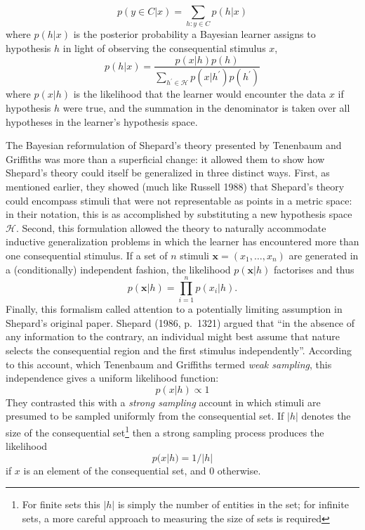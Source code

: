 \documentclass[english,doc]{apa6}
\begin{document}
\begin{equation}
p(y \in C | x) = \sum_{h : y \in C} p(h|x)
\end{equation}
\noindent
where \(p(h|x)\) is the posterior probability a Bayesian learner assigns to hypothesis \(h\) in light of observing the consequential stimulus \(x\),
\begin{equation}
p(h|x) = \frac{p(x|h)p(h)}{\sum_{h^\prime \in \mathcal{H}} p(x | h^\prime) p(h^\prime)}
\end{equation}
where \(p(x|h)\) is the likelihood that the learner would encounter the data \(x\) if hypothesis \(h\) were true, and the summation in the denominator is taken over all hypotheses in the learner's hypothesis space.

The Bayesian reformulation of Shepard's theory presented by Tenenbaum and Griffiths was more than a superficial change: it allowed them to show how Shepard's theory could itself be generalized in three distinct ways. First, as mentioned earlier, they showed (much like Russell 1988) that Shepard's theory could encompass stimuli that were not representable as points in a metric space: in their notation, this is as accomplished by substituting a new hypothesis space \(\mathcal{H}\). Second, this formulation allowed the theory to naturally accommodate inductive generalization problems in which the learner has encountered more than one consequential stimulus. If a set of \(n\) stimuli \(\mathbf{x} = (x_1, \ldots, x_n)\) are generated in a (conditionally) independent fashion, the likelihood \(p(\mathbf{x}|h)\) factorises and thus
\begin{equation}
p(\mathbf{x}|h) = \prod_{i=1}^n p(x_i |h).
\end{equation}
Finally, this formalism called attention to a potentially limiting assumption in Shepard's original paper. Shepard (1986, p.~1321) argued that ``in the absence of any information to the contrary, an individual might best assume that nature selects the consequential region and the first stimulus independently''. According to this account, which Tenenbaum and Griffiths termed \emph{weak sampling}, this independence gives a uniform likelihood function:
\begin{equation}
p(x|h) \propto 1
\end{equation}
They contrasted this with a \emph{strong sampling} account in which stimuli are presumed to be sampled uniformly from the consequential set. If \(|h|\) denotes the size of the consequential set\footnote{For finite sets this \(|h|\) is simply the number of entities in the set; for infinite sets, a more careful approach to measuring the size of sets is required} then a strong sampling process produces the likelihood
\begin{equation}
p(x|h) = 1/|h|
\end{equation}
if \(x\) is an element of the consequential set, and 0 otherwise.
\end{document}
